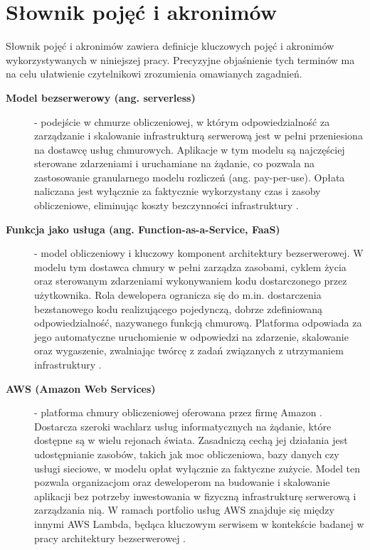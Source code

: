 \chapter*{Słownik pojęć i akronimów}

Słownik pojęć i akronimów zawiera definicje kluczowych pojęć i akronimów wykorzystywanych w niniejszej pracy. 
Precyzyjne objaśnienie tych terminów ma na celu ułatwienie czytelnikowi zrozumienia omawianych zagadnień.


\begin{description}
    \item[\textbf{Model bezserwerowy (ang. serverless)}] - podejście w chmurze obliczeniowej, w którym odpowiedzialność za zarządzanie i skalowanie infrastrukturą serwerową jest w pełni przeniesiona na dostawcę usług chmurowych. Aplikacje w tym modelu są najczęściej sterowane zdarzeniami i uruchamiane na żądanie, co pozwala na zastosowanie granularnego modelu rozliczeń (ang. pay-per-use). Opłata naliczana jest wyłącznie za faktycznie wykorzystany czas i zasoby obliczeniowe, eliminując koszty bezczynności infrastruktury \cite{SpecRgCloudGroupVisionOnThePerformanceChallengesOfFaas}\cite{ServerlessApplicationsWhyWhenAndHow}.

    \item[\textbf{Funkcja jako usługa (ang. Function-as-a-Service, FaaS)}] - model obliczeniowy i kluczowy komponent architektury bezserwerowej. W modelu tym dostawca chmury w pełni zarządza zasobami, cyklem życia oraz sterowanym zdarzeniami wykonywaniem kodu dostarczonego przez użytkownika. Rola dewelopera ogranicza się do m.in. dostarczenia bezstanowego kodu realizującego pojedynczą, dobrze zdefiniowaną odpowiedzialność, nazywanego funkcją chmurową. Platforma odpowiada za jego automatyczne uruchomienie w odpowiedzi na zdarzenie, skalowanie oraz wygaszenie, zwalniając twórcę z zadań związanych z utrzymaniem infrastruktury \cite{SpecRgCloudGroupVisionOnThePerformanceChallengesOfFaas}.

    \item[\textbf{AWS (Amazon Web Services)}] - platforma chmury obliczeniowej oferowana przez firmę Amazon \cite{aws_what_is_aws}. Dostarcza szeroki wachlarz usług informatycznych na żądanie, które dostępne są w wielu rejonach świata. Zasadniczą cechą jej działania jest udostępnianie zasobów, takich jak moc obliczeniowa, bazy danych czy usługi sieciowe, w modelu opłat wyłącznie za faktyczne zużycie. Model ten pozwala organizacjom oraz deweloperom na budowanie i skalowanie aplikacji bez potrzeby inwestowania w fizyczną infrastrukturę serwerową i zarządzania nią. W ramach portfolio usług AWS znajduje się między innymi AWS Lambda, będąca kluczowym serwisem w kontekście badanej w pracy architektury bezserwerowej \cite{aws_what_is_aws}.


\end{description}
